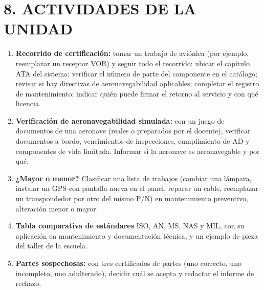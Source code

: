\section*{8. ACTIVIDADES DE LA UNIDAD}
\begin{enumerate}
  \item \textbf{Recorrido de certificación:} tomar un trabajo de aviónica (por ejemplo, reemplazar
        un receptor VOR) y seguir todo el recorrido: ubicar el capítulo ATA del sistema;
        verificar el número de parte del componente en el catálogo; revisar si hay directivas
        de aeronavegabilidad aplicables; completar el registro de mantenimiento; indicar quién
        puede firmar el retorno al servicio y con qué licencia.
  \item \textbf{Verificación de aeronavegabilidad simulada:} con un juego de documentos de una
        aeronave (reales o preparados por el docente), verificar documentos a bordo, vencimientos
        de inspecciones, cumplimiento de AD y componentes de vida limitada. Informar si la
        aeronave es aeronavegable y por qué.
  \item \textbf{¿Mayor o menor?} Clasificar una lista de trabajos (cambiar una lámpara, instalar un
        GPS con pantalla nueva en el panel, reparar un cable, reemplazar un transpondedor por otro
        del mismo P/N) en mantenimiento preventivo, alteración menor o mayor.
  \item \textbf{Tabla comparativa de estándares} ISO, AN, MS, NAS y MIL, con su aplicación en
        mantenimiento y documentación técnica, y un ejemplo de pieza del taller de la escuela.
  \item \textbf{Partes sospechosas:} con tres certificados de partes (uno correcto, uno incompleto,
        uno adulterado), decidir cuál se acepta y redactar el informe de rechazo.
\end{enumerate}
